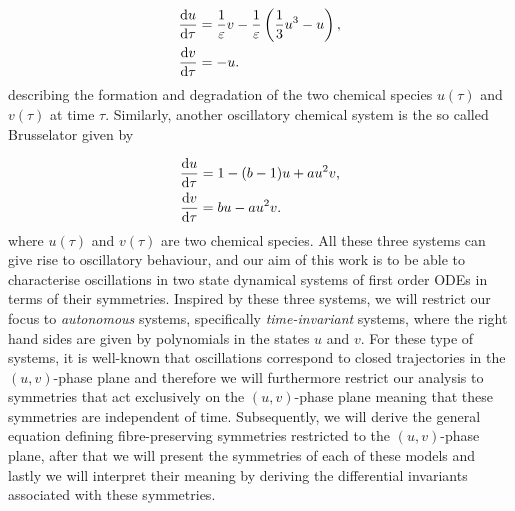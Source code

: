 \begin{equation}
  \begin{split}
    \dv{u}{\tau}&=\dfrac{1}{\varepsilon}v-\dfrac{1}{\varepsilon}\left(\dfrac{1}{3}u^3-u\right),\\
    \dv{v}{\tau}&=-u.\\    
    \end{split}
  \label{eq:BZ}
\end{equation}
describing the formation and degradation of the two chemical species $u(\tau)$ and $v(\tau)$ at time $\tau$. Similarly, another oscillatory chemical system is the so called Brusselator given by

\begin{equation}
  \begin{split}
    \dv{u}{\tau}&=1-(b-1)u+au^2 v,\\
    \dv{v}{\tau}&=bu-au^2 v.\\
    \end{split}
  \label{eq:Brusselator}
\end{equation}
where $u(\tau)$ and $v(\tau)$ are two chemical species. All these three systems can give rise to oscillatory behaviour, and our aim of this work is to be able to characterise oscillations in two state dynamical systems of first order ODEs in terms of their symmetries. Inspired by these three systems, we will restrict our focus to \textit{autonomous} systems, specifically \textit{time-invariant} systems, where the right hand sides are given by polynomials in the states $u$ and $v$. For these type of systems, it is well-known that oscillations correspond to closed trajectories in the $(u,v)$-phase plane and therefore we will furthermore restrict our analysis to symmetries that act exclusively on the $(u,v)$-phase plane meaning that these symmetries are independent of time. Subsequently, we will derive the general equation defining fibre-preserving symmetries restricted to the $(u,v)$-phase plane, after that we will present the symmetries of each of these models and lastly we will interpret their meaning by deriving the differential invariants associated with these symmetries. 


